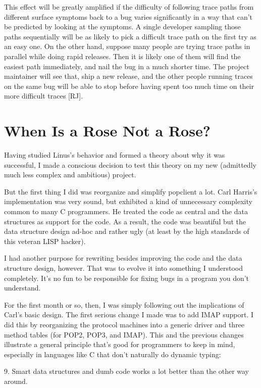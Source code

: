 \documentclass[a4paper,12pt,UTF8,twoside]{ctexbook}
\begin{document}
This effect will be greatly amplified if the difficulty of following trace paths from different surface symptoms back to a bug varies significantly in a way that can't be predicted by looking at the symptoms. A single developer sampling those paths sequentially will be as likely to pick a difficult trace path on the first try as an easy one. On the other hand, suppose many people are trying trace paths in parallel while doing rapid releases. Then it is likely one of them will find the easiest path immediately, and nail the bug in a much shorter time. The project maintainer will see that, ship a new release, and the other people running traces on the same bug will be able to stop before having spent too much time on their more difficult traces [RJ].

\chapter{When Is a Rose Not a Rose?}

Having studied Linus's behavior and formed a theory about why it was successful, I made a conscious decision to test this theory on my new (admittedly much less complex and ambitious) project.

But the first thing I did was reorganize and simplify popclient a lot. Carl Harris's implementation was very sound, but exhibited a kind of unnecessary complexity common to many C programmers. He treated the code as central and the data structures as support for the code. As a result, the code was beautiful but the data structure design ad-hoc and rather ugly (at least by the high standards of this veteran LISP hacker).

I had another purpose for rewriting besides improving the code and the data structure design, however. That was to evolve it into something I understood completely. It's no fun to be responsible for fixing bugs in a program you don't understand.

For the first month or so, then, I was simply following out the implications of Carl's basic design. The first serious change I made was to add IMAP support. I did this by reorganizing the protocol machines into a generic driver and three method tables (for POP2, POP3, and IMAP). This and the previous changes illustrate a general principle that's good for programmers to keep in mind, especially in languages like C that don't naturally do dynamic typing:

9. Smart data structures and dumb code works a lot better than the other way around.
\end{document}
